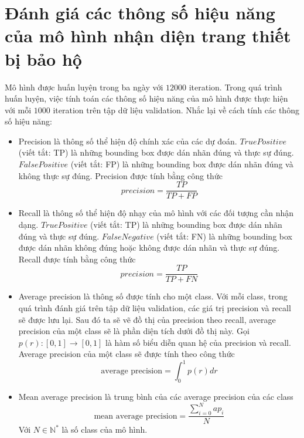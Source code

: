 \chapter{Đánh giá các thông số hiệu năng của mô hình nhận diện trang thiết bị bảo hộ}
Mô hình được huấn luyện trong ba ngày với $12000$ iteration. Trong quá trình huấn luyện, việc tính toán các thông số hiệu năng của mô hình được thực hiện với mỗi $1000$ iteration trên tập dữ liệu validation. 
Nhắc lại về cách tính các thông số hiệu năng:
\begin{itemize}
	\item Precision là thông số thể hiện độ chính xác của các dự đoán. $True Positive$ (viết tắt: TP) là những bounding box được dán nhãn đúng và thực sự đúng. $False Positive$ (viết tắt: FP) là những bounding box được dán nhãn đúng và không thực sự đúng. Precision được tính bằng công thức
	\begin{equation}
		precision = \frac{TP}{TP+FP}
	\end{equation}
	\item Recall là thông số thể hiện độ nhạy của mô hình với các đối tượng cần nhận dạng. $True Positive$ (viết tắt: TP) là những bounding box được dán nhãn đúng và thực sự đúng. $False Negative$ (viết tắt: FN) là những bounding box được dán nhãn không đúng hoặc không được dán nhãn và thực sự đúng. Recall được tính bằng công thức
	\begin{equation}
		precision = \frac{TP}{TP+FN}
	\end{equation}
	\item Average precision là thông số được tính cho một class. Với mỗi class, trong quá trình đánh giá trên tập dữ liệu validation, các giá trị precision và recall sẽ được lưu lại. Sau đó ta sẽ vẽ đồ thị của precision theo recall, average precision của một class sẽ là phần diện tích dưới đồ thị này. Gọi $p(r):[0,1]\rightarrow[0,1]$ là hàm số biểu diễn quan hệ của precision và recall. Average precision của một class sẽ được tính theo công thức
	\begin{equation}
		\text{average precision} = \int_{0}^{1} p(r) dr
	\end{equation}
	\item Mean average precision là trung bình của các average precision của các class
	\begin{equation}
		\text{mean average precision} = \frac{\sum_{i=0}^{N} ap_i}{N}
	\end{equation}
	Với $N \in \mathbb{N}^*$ là số class của mô hình.
\end{itemize}

